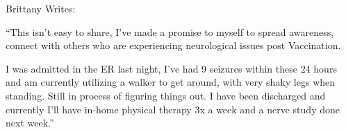 {Brittany Writes:

“This isn’t easy to share, I’ve made a promise to myself to spread awareness,
connect with others who are experiencing neurological issues post Vaccination.

I was admitted in the ER last night, I’ve had 9 seizures within these 24 hours
and am currently utilizing a walker to get around, with very shaky legs when
standing. Still in process of figuring things out. I have been discharged and
currently I’ll have in-home physical therapy 3x a week and a nerve study done
next week.”

}
